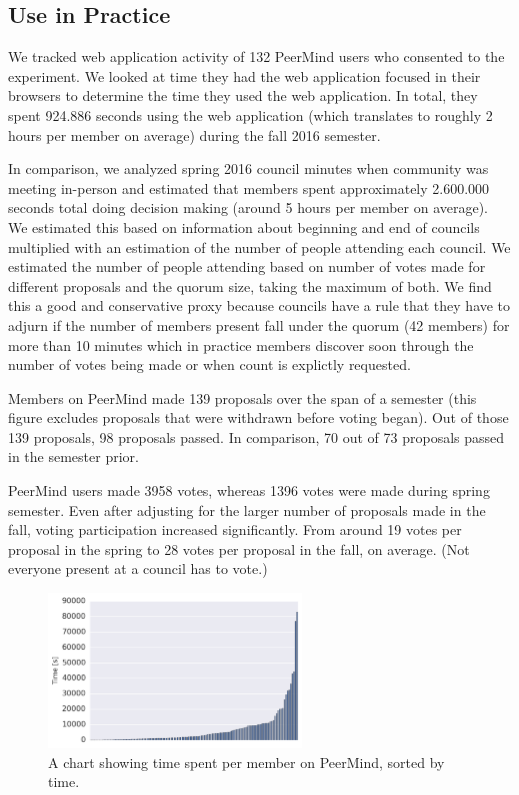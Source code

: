 \documentclass[format=acmsmall, review=true, screen=true, anonymous=true]{acmart}
\begin{document}
\subsection{Use in Practice}

We tracked web application activity of 132 PeerMind users who consented to the experiment.
We looked at time they had the web application focused in their browsers to determine the
time they used the web application.
In total, they spent 924.886 seconds using the web application (which translates to roughly 2 hours
per member on average) during the fall 2016 semester.

In comparison, we analyzed spring 2016 council minutes when community was meeting in-person and
estimated that members spent approximately 2.600.000 seconds total doing decision making
(around 5 hours per member on average).
We estimated this based on information about beginning and end of councils multiplied
with an estimation of the number of people attending each council.
We estimated the number of people attending based on number of votes made for different proposals
and the quorum size, taking the maximum of both.
We find this a good and conservative proxy because councils have a rule that they have to adjurn
if the number of members present fall under the quorum (42 members) for more than 10 minutes
which in practice members discover soon through the number of votes being made or when count
is explictly requested.

Members on PeerMind made 139 proposals over the span of a semester (this figure
excludes proposals that were withdrawn before voting began).
Out of those 139 proposals, 98 proposals passed. In comparison, 70 out of 73 proposals passed
in the semester prior.

PeerMind users made 3958 votes, whereas 1396 votes were made during spring semester.
Even after adjusting for the larger number of proposals made in the fall, voting participation
increased significantly.
From around 19 votes per proposal in the spring to 28 votes per proposal in the fall, on average.
(Not everyone present at a council has to vote.)

\begin{figure}[ht]
\centering
\includegraphics[width=0.6\textwidth]{figures/people-sorted-time-chart.png}
\caption{A chart showing time spent per member on PeerMind, sorted by time.}
\label{fig:time}
\end{figure}
\end{document}
